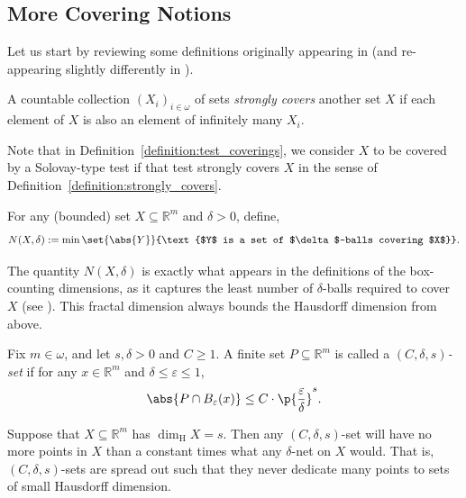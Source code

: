 \subsection{More Covering Notions}

Let us start by reviewing some definitions originally appearing in \cite{KT01} (and re-appearing slightly differently in \cite{Orp21}). 

\begin{definition}
    \label{definition:strongly_covers}
    A countable collection $(X_i)_{i \in \omega}$ of sets \textit{strongly covers} another set $X$ if each element of $X$ is also an element of infinitely many $X_i$. 
\end{definition}
Note that in Definition~\ref{definition:test_coverings}, we consider $X$ to be covered by a Solovay-type test if that test strongly covers $X$ in the sense of Definition~\ref{definition:strongly_covers}.

\begin{definition}
    For any (bounded) set $X \subseteq \mathbb{R}^m$ and $\delta > 0$, define,
    \begin{align*}
        N(X, \delta) := \min \set{\abs{Y}}{\text{$Y$ is a set of $\delta$-balls covering $X$}}.
    \end{align*}
\end{definition}

The quantity $N(X, \delta)$ is exactly what appears in the definitions of the box-counting dimensions, as it captures the least number of $\delta$-balls required to cover $X$ (see \cite{Fal90}). This fractal dimension always bounds the Hausdorff dimension from above.

\begin{definition}
    \label{definition:C_delta_s_set}
    Fix $m \in \omega$, and let $s, \delta > 0$ and $C \geq 1$. A finite set $P \subseteq \mathbb{R}^m$ is called a \textit{$(C, \delta, s)$-set} if for any $x \in \mathbb{R}^m$ and $\delta \leq \varepsilon \leq 1$,
    \begin{align*}
        \abs{P \cap B_\varepsilon(x)} \leq C \cdot \p{\frac{\varepsilon}{\delta}}^s.
    \end{align*}
\end{definition}
Suppose that $X \subseteq \mathbb{R}^m$ has $\dim_{\operatorname{H}} X = s$. Then any $(C, \delta, s)$-set will have no more points in $X$ than a constant times what any $\delta$-net on $X$ would. That is, $(C, \delta, s)$-sets are spread out such that they never dedicate many points to sets of small Hausdorff dimension.


